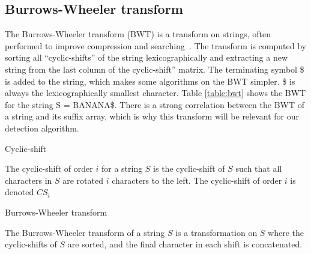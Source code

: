 \subsection*{Burrows-Wheeler transform}

The Burrows-Wheeler transform (BWT) is a transform on strings, often performed to improve
compression and searching~\cite{BWT}. The transform is computed by sorting all
``cyclic-shifts'' of the string lexicographically and extracting a new string from the
last column of the cyclic-shift'' matrix. The terminating symbol \$ is added to the
string, which makes some algorithms on the BWT simpler. \$ is always the lexicographically
smallest character. Table \ref{table:bwt} shows the BWT for the string S = BANANA\$. There
is a strong correlation between the BWT of a string and its suffix array, which is why this
transform will be relevant for our detection algorithm.

\begin{definition}{Cyclic-shift}

    The cyclic-shift of order $i$ for a string $S$ is the cyclic-shift of $S$ such that
    all characters in $S$ are rotated $i$ characters to the left. The cyclic-shift of
    order $i$ is denoted $CS_i$

\end{definition}

\begin{definition}{Burrows-Wheeler transform}

The Burrows-Wheeler transform of a string $S$ is a transformation on $S$ where the
cyclic-shifts of $S$ are sorted, and the final character in each shift is concatenated.

\end{definition}


